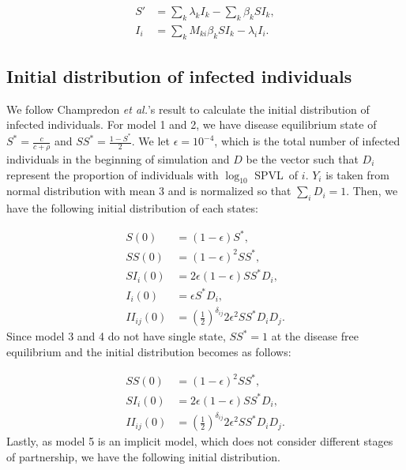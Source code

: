 \documentclass[10pt,letterpaper]{article}
\newcommand{\khalf}{\left(\frac{1}{2}\right)^{\delta_{ij}}}  %
\newcommand{\Lspvl}{$\log_{10}$ SPVL}
\newcommand{\etal}{\textit{et al.}}
\begin{document}
\begin{equation}
\begin{aligned}
S' & = \sum_k \lambda_k I_k - \sum_k \beta_k S I_k,\\
I_i & = \sum_k M_{ki} \beta_k S I_k - \lambda_i I_i.
\end{aligned}
\end{equation}


\subsection*{Initial distribution of infected individuals}

We follow Champredon \etal's result to calculate the initial distribution of infected individuals. For model 1 and 2, we have disease equilibrium state of $S^* = \frac{c}{c + \rho}$ and $SS^* = \frac{1-S^*}{2}$. We let $\epsilon = 10^{-4}$, which is the total number of infected individuals in the beginning of simulation and $D$ be the vector such that $D_i$ represent the proportion of individuals with \Lspvl\ of $i$. $Y_i$ is taken from normal distribution with mean 3 and is normalized so that $\sum_i D_i = 1$. Then, we have the following initial distribution of each states:

\begin{equation}
\begin{aligned}
S(0) &= (1 - \epsilon) S^*, \\
SS(0) &= (1 - \epsilon)^2 SS^*,\\
SI_i(0) &= 2 \epsilon (1-\epsilon) SS^* D_i,\\
I_i(0) &=  \epsilon S^* D_i,\\
II_{ij}(0) &=  \khalf 2\epsilon^2 SS^* D_i D_j.
\end{aligned}
\end{equation}
Since model 3 and 4 do not have single state, $SS^*=1$ at the disease free equilibrium and the initial distribution becomes as follows:

\begin{equation}
\begin{aligned}
SS(0) &= (1 - \epsilon)^2 SS^*,\\
SI_i(0) &= 2 \epsilon (1-\epsilon) SS^* D_i,\\
II_{ij}(0) &=  \khalf 2\epsilon^2 SS^* D_i D_j.
\end{aligned}
\end{equation}
Lastly, as model 5 is an implicit model, which does not consider different stages of partnership, we have the following initial distribution.
\end{document}
